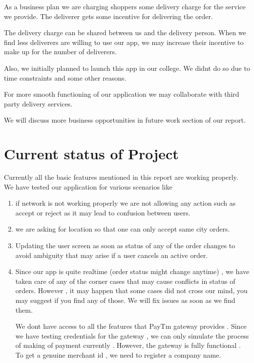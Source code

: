 \documentclass{report}
\begin{document}
As a business plan we are charging shoppers some delivery charge for the service we provide. The deliverer gets some incentive for delivering the order.

The delivery charge can be shared between us and the delivery person. When we find less deliverers are willing to use our app, we may increase their incentive to make up for the number of deliverers. 

Also, we initially planned to launch this app in our college. We didn\textquotesingle t do so due to time constraints and some other reasons.

For more smooth functioning of our application we may collaborate with third party delivery services.

We will discuss more business opportunities in future work section of our report.


\chapter{Current status of Project}
Currently all the basic features mentioned in this report are working properly.\\

We have tested our application for various scenarios like
\begin{enumerate}[label=\roman*)]
\item  if network is not working properly we are not allowing any action such as accept or reject as it may lead to confusion between users.
\item we are asking for location so that one can only accept same city orders.
\item  Updating the user screen as soon as status of any of the order changes to avoid ambiguity that may arise if a user cancels an active order.
\item Since our app is quite realtime (order status might change anytime) , we have taken care of any of the corner cases that may cause conflicts in status of orders. However , it may happen that some cases did not cross our mind, you may suggest if you find any of those. We will fix issues as soon as we find them.

\par We don\textquotesingle t have access to all the features that PayTm gateway provides . Since we have testing credentials for the gateway , we can only simulate the process of making of payment currently  . However, the gateway is fully functional .
To get a genuine merchant id , we need to register a company name.

\end{enumerate}
\end{document}
